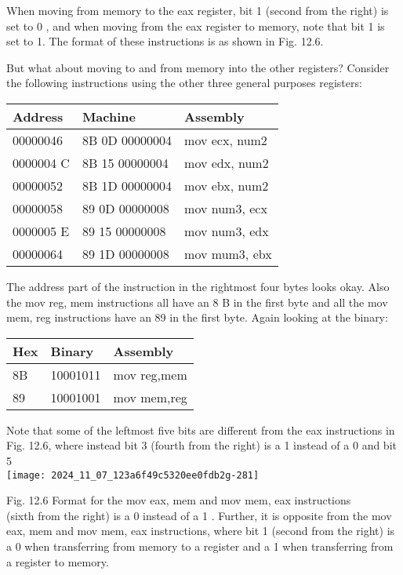 \documentclass[10pt]{article}
\begin{document}
When moving from memory to the eax register, bit 1 (second from the right) is set to 0 , and when moving from the eax register to memory, note that bit 1 is set to 1. The format of these instructions is as shown in Fig. 12.6.

But what about moving to and from memory into the other registers? Consider the following instructions using the other three general purposes registers:

\begin{center}
\begin{tabular}{|l|l|l|}
\hline
Address & Machine & Assembly \\
\hline
00000046 & 8B 0D 00000004 & mov ecx, num2 \\
\hline
0000004 C & 8B 15 00000004 & mov edx, num2 \\
\hline
00000052 & 8B 1D 00000004 & mov ebx, num2 \\
\hline
00000058 & 89 0D 00000008 & mov num3, ecx \\
\hline
0000005 E & 89 15 00000008 & mov num3, edx \\
\hline
00000064 & 89 1D 00000008 & mov mum3, ebx \\
\hline
\end{tabular}
\end{center}

The address part of the instruction in the rightmost four bytes looks okay. Also the mov reg, mem instructions all have an 8 B in the first byte and all the mov mem, reg instructions have an 89 in the first byte. Again looking at the binary:

\begin{center}
\begin{tabular}{|l|l|l|}
\hline
Hex & Binary & Assembly \\
\hline
8B & 10001011 & mov reg,mem \\
\hline
89 & 10001001 & mov mem,reg \\
\hline
\end{tabular}
\end{center}

Note that some of the leftmost five bits are different from the eax instructions in Fig. 12.6, where instead bit 3 (fourth from the right) is a 1 instead of a 0 and bit 5\\
\texttt{[image: 2024\_11\_07\_123a6f49c5320ee0fdb2g-281]}

Fig. 12.6 Format for the mov eax, mem and mov mem, eax instructions\\
(sixth from the right) is a 0 instead of a 1 . Further, it is opposite from the mov eax, mem and mov mem, eax instructions, where bit 1 (second from the right) is a 0 when transferring from memory to a register and a 1 when transferring from a register to memory.
\end{document}
